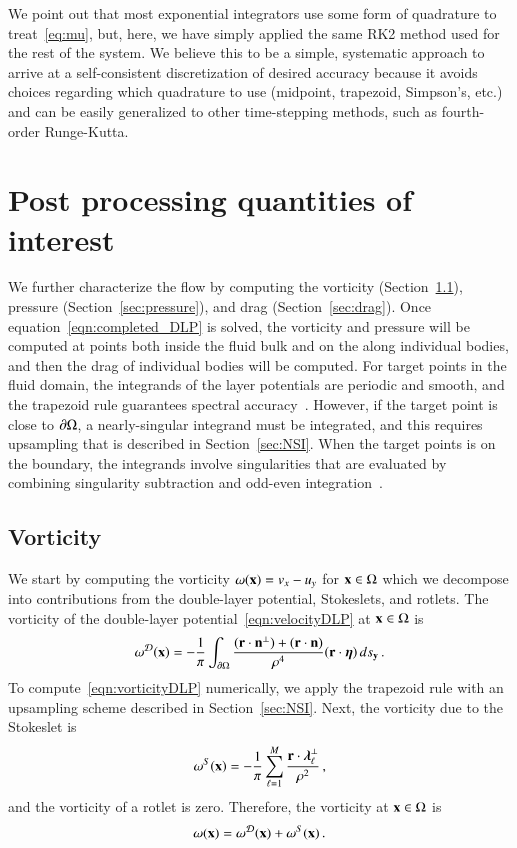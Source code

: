 \documentclass[preprint, 10pt]{elsarticle}
\begin{document}
We point out that most exponential integrators use some form of quadrature to treat~\eqref{eq:mu}, but, here, we have simply applied the same RK2 method used for the rest of the system. We believe this to be a simple, systematic approach to arrive at a self-consistent discretization of desired accuracy because it avoids choices regarding which quadrature to use (midpoint, trapezoid, Simpson's, etc.) and can be easily generalized to other time-stepping methods, such as fourth-order Runge-Kutta. 


\section{Post processing quantities of interest}
\label{s:qoi}
We further characterize the flow by computing the vorticity (Section~\ref{sec:vorticity}), pressure (Section~\ref{sec:pressure}), and drag (Section~\ref{sec:drag}).  Once equation~\eqref{eqn:completed_DLP} is solved, the vorticity and pressure will be computed at points both inside the fluid bulk and on the along individual bodies, and then the drag of individual bodies will be computed.  For target points in the fluid domain, the integrands of the layer potentials are periodic and smooth, and the trapezoid rule guarantees spectral accuracy~\cite{tre-wei2014}.  However, if the target point is close to ${\partial} \Omega$, a nearly-singular integrand must be integrated, and this requires upsampling that is described in Section~\ref{sec:NSI}.  When the target points is on the boundary, the integrands involve singularities that are evaluated by combining singularity subtraction and odd-even integration~\cite{sid-isr1988}.  

\subsection{Vorticity}
\label{sec:vorticity}
We start by computing the vorticity $\omega({\mathbf{x}}) = v_x - u_y$ for ${\mathbf{x}} \in \Omega$ which we decompose into contributions from the double-layer potential, Stokeslets, and rotlets.  The vorticity of the double-layer potential~\eqref{eqn:velocityDLP} at ${\mathbf{x}} \in \Omega$ is
\begin{align}
  \omega^{{\mathcal{D}}}({\mathbf{x}}) = -\frac{1}{\pi}\int_{{\partial}\Omega} 
    \frac{({\mathbf{r}} \cdot {\mathbf{n}}^\perp) + ({\mathbf{r}} \cdot {\mathbf{n}})}{\rho^4}
    ({\mathbf{r}} \cdot {\boldsymbol\eta}) \, ds_{{\mathbf{y}}}\, .
  \label{eqn:vorticityDLP}
\end{align}
To compute~\eqref{eqn:vorticityDLP} numerically, we apply the trapezoid rule with an upsampling scheme described in Section~\ref{sec:NSI}.  Next, the vorticity due to the Stokeslet is
\begin{align}
  \omega^S({\mathbf{x}}) = -\frac{1}{\pi} \sum_{\ell=1}^{M} 
    \frac{{\mathbf{r}} \cdot {\boldsymbol\lambda}_\ell^\perp}{\rho^2}\, ,
\end{align}
and the vorticity of a rotlet is zero.  Therefore, the vorticity at ${\mathbf{x}}
\in \Omega$ is
\begin{align}
  \omega({\mathbf{x}}) = \omega^{\mathcal{D}}({\mathbf{x}}) + \omega^S({\mathbf{x}})\, .
\end{align}
\end{document}

